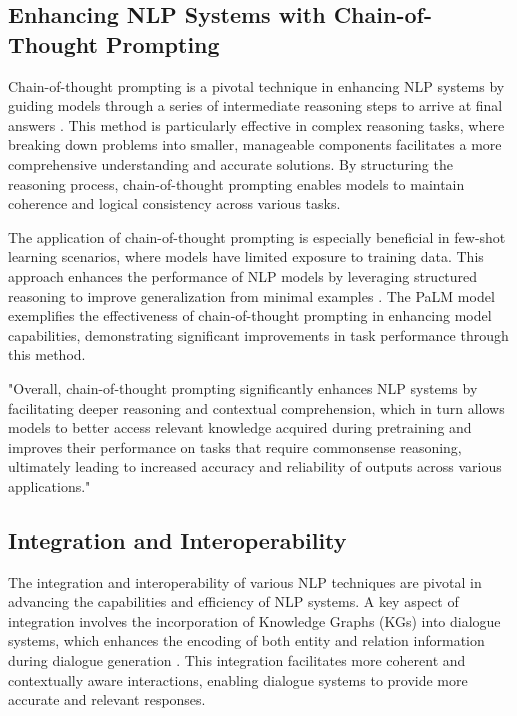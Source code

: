 
\subsection{Enhancing NLP Systems with Chain-of-Thought Prompting} \label{subsec:Enhancing NLP Systems with Chain-of-Thought Prompting}

Chain-of-thought prompting is a pivotal technique in enhancing NLP systems by guiding models through a series of intermediate reasoning steps to arrive at final answers \cite{wei2022chain}. This method is particularly effective in complex reasoning tasks, where breaking down problems into smaller, manageable components facilitates a more comprehensive understanding and accurate solutions. By structuring the reasoning process, chain-of-thought prompting enables models to maintain coherence and logical consistency across various tasks.



The application of chain-of-thought prompting is especially beneficial in few-shot learning scenarios, where models have limited exposure to training data. This approach enhances the performance of NLP models by leveraging structured reasoning to improve generalization from minimal examples \cite{chowdhery2023palm}. The PaLM model exemplifies the effectiveness of chain-of-thought prompting in enhancing model capabilities, demonstrating significant improvements in task performance through this method.



"Overall, chain-of-thought prompting significantly enhances NLP systems by facilitating deeper reasoning and contextual comprehension, which in turn allows models to better access relevant knowledge acquired during pretraining and improves their performance on tasks that require commonsense reasoning, ultimately leading to increased accuracy and reliability of outputs across various applications." \cite{wei2022chain}



\subsection{Integration and Interoperability} \label{subsec:Integration and Interoperability}

The integration and interoperability of various NLP techniques are pivotal in advancing the capabilities and efficiency of NLP systems. A key aspect of integration involves the incorporation of Knowledge Graphs (KGs) into dialogue systems, which enhances the encoding of both entity and relation information during dialogue generation \cite{chaudhuri2021groundingdialoguesystemsknowledge}. This integration facilitates more coherent and contextually aware interactions, enabling dialogue systems to provide more accurate and relevant responses.



